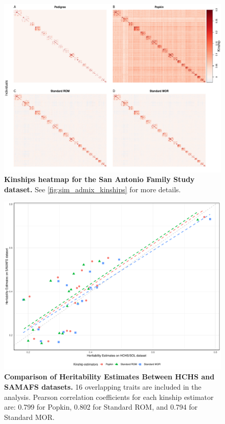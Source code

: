 \documentclass[11pt]{article}
\begin{document}
\begin{figure}[bp!]
  \centering
  \includegraphics[width=\textwidth]{data/SFig_T2D_kinships.pdf}
  \caption{
    {\bf Kinships heatmap for the San Antonio Family
Study dataset.}
    See \cref{fig:sim_admix_kinships} for more details.
    }
  \label{fig:T2D_kinships}
\end{figure}

\begin{figure}[bp!]
  \centering
  \includegraphics[width=\textwidth]{data/hchs_t2d_compare.pdf}
  \caption{
    {\bf Comparison of Heritability Estimates Between HCHS and SAMAFS datasets.} 16 overlapping traits are included in the analysis.
    Pearson correlation coefficients for each kinship estimator are: 0.799 for Popkin, 0.802 for Standard ROM, and 0.794 for Standard MOR.
    }
  \label{fig:hchs_t2d_compare}
\end{figure}
\end{document}
